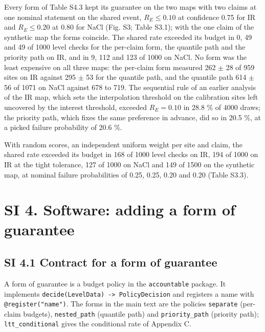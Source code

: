 \documentclass{iopjournal}
\begin{document}
Every form of Table S4.3 kept its guarantee on the two maps with two claims at one nominal statement on the shared event, \(R_E \le 0.10\) at confidence 0.75 for IR and \(R_E \le 0.20\) at 0.80 for NaCl (Fig. S3; Table S3.1); with the one claim of the synthetic map the forms coincide. The shared rate exceeded its budget in 0, 49 and 49 of 1000 level checks for the per-claim form, the quantile path and the priority path on IR, and in 9, 112 and 123 of 1000 on NaCl. No form was the least expensive on all three maps: the per-claim form measured 262 \ensuremath{\pm} 28 of 959 sites on IR against 295 \ensuremath{\pm} 53 for the quantile path, and the quantile path 614 \ensuremath{\pm} 56 of 1071 on NaCl against 678 to 719. The sequential rule of an earlier analysis of the IR map, which sets the interpolation threshold on the calibration sites left uncovered by the interest threshold, exceeded \(R_E = 0.10\) in 28.8 \% of 4000 draws; the priority path, which fixes the same preference in advance, did so in 20.5 \%, at a picked failure probability of 20.6 \%.

With random scores, an independent uniform weight per site and claim, the shared rate exceeded its budget in 168 of 1000 level checks on IR, 194 of 1000 on IR at the tight tolerance, 127 of 1000 on NaCl and 149 of 1500 on the synthetic map, at nominal failure probabilities of 0.25, 0.25, 0.20 and 0.20 (Table S3.3).

\hypertarget{si-4.-software-adding-a-form-of-guarantee}{%
\section*{SI 4. Software: adding a form of guarantee}\label{si-4.-software-adding-a-form-of-guarantee}}

\hypertarget{si-4.1-contract-for-a-form-of-guarantee}{%
\subsection*{SI 4.1 Contract for a form of guarantee}\label{si-4.1-contract-for-a-form-of-guarantee}}

A form of guarantee is a budget policy in the \texttt{accountable} package. It implements \texttt{decide(LevelData)\ -\textgreater{}\ PolicyDecision} and registers a name with \texttt{@register("name")}. The forms in the main text are the policies \texttt{separate} (per-claim budgets), \texttt{nested\_path} (quantile path) and \texttt{priority\_path} (priority path); \texttt{ltt\_conditional} gives the conditional rate of Appendix C.
\end{document}
